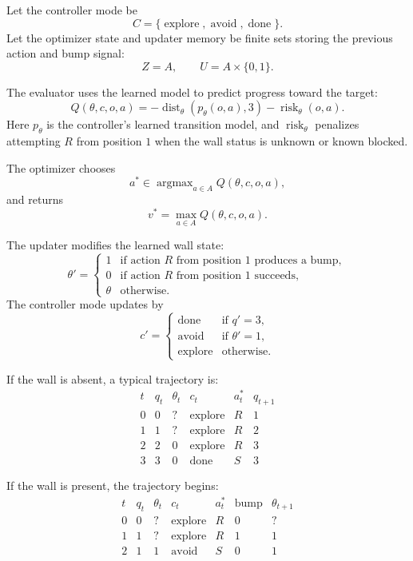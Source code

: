Let the controller mode be
\[
C=\{\operatorname{explore},\operatorname{avoid},\operatorname{done}\}.
\]
Let the optimizer state and updater memory be finite sets storing the previous action and bump
signal:
\[
Z=A,
\qquad
U=A\times\{0,1\}.
\]

The evaluator uses the learned model to predict progress toward the target:
\[
Q(\theta,c,o,a)
=
-\operatorname{dist}_{\theta}(p_{\theta}(o,a),3)
-
\operatorname{risk}_{\theta}(o,a).
\]
Here \(p_\theta\) is the controller's learned transition model, and \(\operatorname{risk}_\theta\)
penalizes attempting \(R\) from position \(1\) when the wall status is unknown or known blocked.

The optimizer chooses
\[
a^*\in\operatorname{argmax}_{a\in A}Q(\theta,c,o,a),
\]
and returns
\[
v^*=\max_{a\in A}Q(\theta,c,o,a).
\]

The updater modifies the learned wall state:
\[
\theta'=
\begin{cases}
1 & \text{if action } R \text{ from position } 1 \text{ produces a bump},\\
0 & \text{if action } R \text{ from position } 1 \text{ succeeds},\\
\theta & \text{otherwise}.
\end{cases}
\]
The controller mode updates by
\[
c'=
\begin{cases}
\operatorname{done} & \text{if } q'=3,\\
\operatorname{avoid} & \text{if } \theta'=1,\\
\operatorname{explore} & \text{otherwise}.
\end{cases}
\]

If the wall is absent, a typical trajectory is:
\[
\begin{array}{c|c|c|c|c|c}
t & q_t & \theta_t & c_t & a_t^* & q_{t+1} \\
\hline
0 & 0 & ? & \operatorname{explore} & R & 1 \\
1 & 1 & ? & \operatorname{explore} & R & 2 \\
2 & 2 & 0 & \operatorname{explore} & R & 3 \\
3 & 3 & 0 & \operatorname{done} & S & 3
\end{array}
\]

If the wall is present, the trajectory begins:
\[
\begin{array}{c|c|c|c|c|c|c}
t & q_t & \theta_t & c_t & a_t^* & \text{bump} & \theta_{t+1} \\
\hline
0 & 0 & ? & \operatorname{explore} & R & 0 & ? \\
1 & 1 & ? & \operatorname{explore} & R & 1 & 1 \\
2 & 1 & 1 & \operatorname{avoid} & S & 0 & 1
\end{array}
\]

